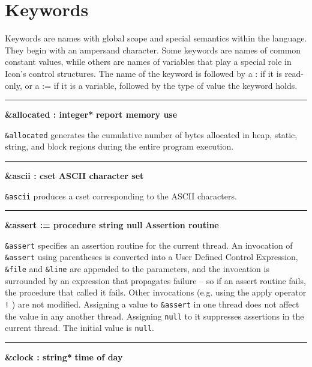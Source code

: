 \section{Keywords}

Keywords are names with global scope and special semantics within
the language. They begin with an ampersand character. Some keywords are names of
common constant values, while others are names of variables that play a special
role in Icon's control structures. The
name of the keyword is followed by a : if it is read-only, or a := if it is a
variable, followed by the type of value the keyword holds.

\bigskip\hrule\vspace{0.1cm}
\noindent
{\bf \&allocated : integer* } \hfill {\bf report memory use}

\noindent
{}\texttt{\&allocated} generates the cumulative number
of bytes allocated in heap, static, string, and block regions during
the entire program execution.

\bigskip\hrule\vspace{0.1cm}
\noindent
{\bf \&ascii : cset } \hfill {\bf ASCII character set}

\noindent
{}\texttt{\&ascii} produces a cset corresponding to
the ASCII characters.

\bigskip\hrule\vspace{0.1cm}
\noindent
{\bf \&assert := procedure  \textbar \hspace{0.1cm} string \textbar \hspace{0.1cm} null}
\hfill {\bf Assertion routine}

\noindent
{}\texttt{\&assert} specifies an assertion routine for the
current thread.
An invocation of \texttt{\&assert} using parentheses is converted into a
User Defined Control Expression, \texttt{\&file} and \texttt{\&line} are
appended to the parameters, and the invocation is surrounded by an expression
that propagates failure -- so if an assert routine fails, the procedure that
called it fails.
Other invocations (e.g. using the apply operator \texttt{!} ) are not modified.
\ConcurrencyIssue Assigning a value to \texttt{\&assert} in one thread does
not affect the value in any another thread.
Assigning \texttt{null} to it suppresses assertions in the current thread.
The initial value is \texttt{null}.

\bigskip\hrule\vspace{0.1cm}
\noindent
{\bf \&clock : string* } \hfill {\bf time of day}

